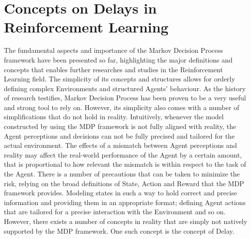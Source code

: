     \newpage
    \section{Concepts on Delays in Reinforcement Learning}
    \label{defproblem:delays}
        The fundamental aspects and importance of the Markov Decision Process framework have been presented so far, highlighting the major definitions and concepts that enables further researches and studies in the Reinforcement Learning field. The simplicity of its concepts and structures allows for orderly defining complex Environments and structured Agents' behaviour. As the history of research testifies, Markov Decision Process has been proven to be a very useful and strong tool to rely on. \newline
        However, its simplicity also comes with a number of simplifications that do not hold in reality. Intuitively, whenever the model constructed by using the MDP framework is not fully aligned with reality, the Agent perceptions and decisions can not be fully precised and tailored for the actual environment. The effects of a mismatch between Agent perceptions and reality may affect the real-world performance of the Agent by a certain amount, that is proportional to how relevant the mismatch is within respect to the task of the Agent. \newline
        There is a number of precautions that can be taken to minimize the risk, relying on the broad definitions of State, Action and Reward that the MDP framework provides. Modeling states in such a way to hold correct and precise information and providing them in an appropriate format; defining Agent actions that are tailored for a precise interaction with the Environment and so on. However, there exists a number of concepts in reality that are simply not natively supported by the MDP framework. One such concept is the concept of Delay.
        
